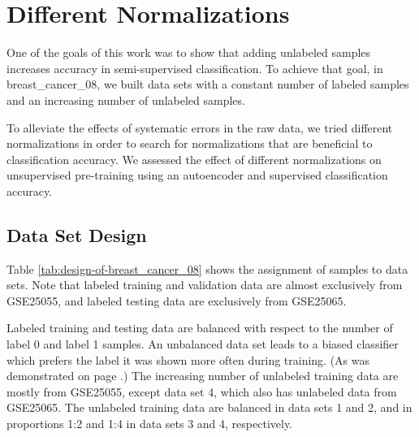 \section{Different Normalizations\label{sec:breast_cancer_08}}

One of the goals of this work was to show that adding unlabeled samples
increases accuracy in semi-supervised classification. To achieve that
goal, in breast\_cancer\_08,
we built data sets with a constant number of labeled samples and an
increasing number of unlabeled samples.

To alleviate the effects of systematic errors in the raw data, we
tried different normalizations in order to search for normalizations
that are beneficial to classification accuracy. We assessed the effect
of different normalizations on unsupervised pre-training using an
autoencoder and supervised classification accuracy.

\subsection{Data Set Design}

Table \ref{tab:design-of-breast_cancer_08} shows the assignment of
samples to data sets. Note that labeled training and validation data
are almost exclusively from GSE25055, and labeled testing data are
exclusively from GSE25065.

Labeled training and testing data are balanced with respect to the
number of label 0 and label 1 samples. An unbalanced data set leads
to a biased classifier which prefers the label it was shown more often
during training. (As was demonstrated on page \pageref{par:Examining-biased-classifier}.)
The increasing number of unlabeled training data are mostly from GSE25055,
except data set 4, which also has unlabeled data from GSE25065. The
unlabeled training data are balanced in data sets 1 and 2, and in
proportions 1:2 and 1:4 in data sets 3 and 4, respectively.

